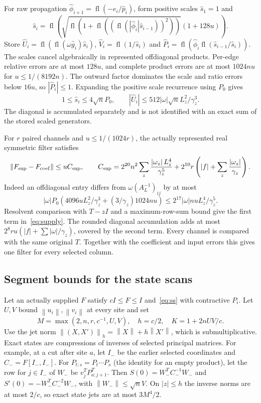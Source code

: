 \documentclass[11pt]{article}
\theoremstyle{remark}\newtheorem{remark}[theorem]{Remark}
\newcommand{\norm}[1]{\left\lVert#1\right\rVert}
\newcommand{\abs}[1]{\left\lvert#1\right\rvert}
\newcommand{\fl}{\operatorname{fl}}
\begin{document}
For raw propagation $\widehat\phi_{i+1}=\fl(-e_i/\widehat p_i)$,
form positive scales $\widehat s_1=1$ and
\[
 \widehat s_i=\fl\left(
  \sqrt{\fl(1+\fl((\fl(\abs{\widehat\phi_i}\widehat s_{i-1}))^2))}
       (1+128u)\right).
\]
Store $\widehat U_i=\fl(\fl(\omega\widehat g_i)\widehat s_i)$,
$\widehat V_i=\fl(1/\widehat s_i)$ and
$\widehat P_i=\fl(\widehat\phi_i\fl(\widehat s_{i-1}/\widehat s_i))$.
The scales cancel algebraically in represented offdiagonal products. Per-edge
relative errors are at most $128u$, and complete product errors are at most
$1024nu$ for $u\le1/(8192n)$. The outward factor dominates the scale and
ratio errors below $16u$, so $\abs{\widehat P_i}\le1$.
Expanding the positive scale recurrence using $P_0$ gives
\[
 1\le\widehat s_i\le4\sqrt n P_0,\qquad
 \abs{\widehat U_i}\le512\abs\omega\sqrt nL_z^2/\gamma_z^3.
\]
The diagonal is accumulated separately and is not identified with an exact
sum of the stored scaled generators.

For $r$ paired channels and $u\le1/(1024r)$, the actually represented
real symmetric filter satisfies
\begin{equation}\label{eq:supply}
 \norm{F_{\rm sup}-F_{\rm coef}}\le uC_{\rm sup},\qquad
 C_{\rm sup}=2^{20}n^2\sum_z\frac{\abs{\omega_z}L_z^4}{\gamma_z^5}
       +2^{10}r\left(\abs f+\sum_z\frac{\abs{\omega_z}}{\gamma_z}\right).
\end{equation}
Indeed an offdiagonal entry differs from $\omega(A_L^{-1})_{ij}$ by at most
\[
 \abs\omega P_0\left(4096uL_z^2/\gamma_z^3+
                          (3/\gamma_z)1024nu\right)
 \le2^{17}\abs\omega nuL_z^4/\gamma_z^5.
\]
Resolvent comparison with $T-zI$ and a maximum-row-sum bound give the first
term in~\eqref{eq:supply}. The rounded diagonal accumulation adds at most
$2^8ru(\abs f+\sum\abs\omega/\gamma_z)$, covered by the second term.
Every channel is compared with the same original $T$. Together with the
coefficient and input errors this gives one filter for every selected column.

\subsection{Segment bounds for the state scans}
Let an actually supplied $F$ satisfy $cI\le F\le I$ and~\eqref{eq:ss}
with contractive $P_i$. Let $U,V$ bound $\norm{u_i},\norm{v_i}$ at every site and set
\[
 M=\max(2,n,r,c^{-1},U,V),\quad h=c/2,\quad K=1+2nUV/c.
\]
Use the jet norm $\norm{(X,X')}_h=\norm X+h\norm{X'}$, which is
submultiplicative. Exact states are compressions of inverses of selected
principal matrices. For example, at a cut after site $a$, let $I_-$ be the earlier selected
coordinates and $C_-=F[I_-,I_-]$. For $P_{t:s}=P_t\cdots P_s$
(the identity for an empty product), let the row for $j\in I_-$ of
$W_-$ be $v_j^TP_{a:j+1}^T$. Then
$S(0)=W_-^TC_-^{-1}W_-$ and $S'(0)=-W_-^TC_-^{-2}W_-$,
with $\norm{W_-}\le\sqrt nV$. On $\abs z\le h$ the inverse norms are at most
$2/c$, so exact state jets are at most $3M^4/2$.
\end{document}
